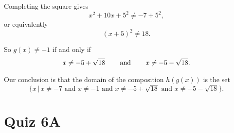 \documentclass{ximera}
\begin{document}
\begin{question}
\begin{explanation}
\begin{enumerate}
Completing the square gives
\[
  x^2 + 10x + 5^2 \neq -7 + 5^2,
\]
or equivalently
\[
 (x+5)^2 \neq 18.
\]

So $g(x)\neq -1$ if and only if
\[
   x \neq -5 + \sqrt{18} \hskip 0.3in \text{and} \hskip 0.3 in x \neq -5 - \sqrt{18}.
\]

Our conclusion is that the domain of the composition $h(g(x))$ is the set
\[
 \{  x \, | \, x\neq -7 \text{ and } x\neq -1 \text{ and }   x \neq -5 + \sqrt{18} \text{ and }  x \neq -5 - \sqrt{18}     \}.
\]

\end{enumerate}
\end{explanation}
\end{question}


\section{Quiz 6A}
\end{document}
